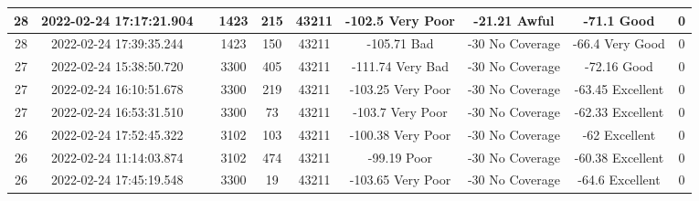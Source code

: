 \begin{longtable*}{|c|c|c|c|c|c|c|c|c|c|}
28&2022-02-24 17:17:21.904&&1423&215&43211& -102.5    Very Poor   & -21.21    Awful       & -71.1     Good        & 0\\\hline
{}28&2022-02-24 17:39:35.244&&1423&150&43211& -105.71   Bad         & -30       No Coverage & -66.4     Very Good   & 0\\\hline
{}27&2022-02-24 15:38:50.720&&3300&405&43211& -111.74   Very Bad    & -30       No Coverage & -72.16    Good        & 0\\\hline
{}27&2022-02-24 16:10:51.678&&3300&219&43211& -103.25   Very Poor   & -30       No Coverage & -63.45    Excellent   & 0\\\hline
{}27&2022-02-24 16:53:31.510&&3300&73&43211& -103.7    Very Poor   & -30       No Coverage & -62.33    Excellent   & 0\\\hline
{}26&2022-02-24 17:52:45.322&&3102&103&43211& -100.38   Very Poor   & -30       No Coverage & -62       Excellent   & 0\\\hline
{}26&2022-02-24 11:14:03.874&&3102&474&43211& -99.19    Poor        & -30       No Coverage & -60.38    Excellent   & 0\\\hline
{}26&2022-02-24 17:45:19.548&&3300&19&43211& -103.65   Very Poor   & -30       No Coverage & -64.6     Excellent   & 0\\\hline

\end{longtable*}
